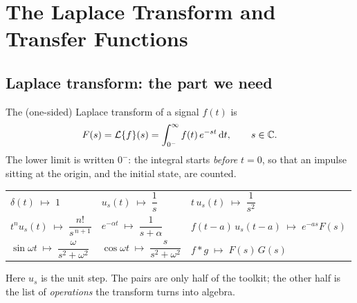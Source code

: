 \documentclass[11pt]{article}
\begin{document}


\section{The Laplace Transform and Transfer Functions}

\subsection{Laplace transform: the part we need}
The (one-sided) Laplace transform of a signal $f(t)$ is
\begin{equation}\label{eq:laplace}
   F(s) = \mathcal{L}\{f\}(s) = \int_{0^{-}}^{\infty} f(t)\,e^{-st}\,\mathrm{d} t ,
   \qquad s\in\mathbb{C}.
\end{equation}
The lower limit is written $0^{-}$: the integral starts \emph{before} $t=0$, so
that an impulse sitting at the origin, and the initial state, are counted.

\smallskip
\begin{center}
\renewcommand{\arraystretch}{2.0}
\begin{tabular}{@{}l@{\qquad\qquad}l@{\qquad\qquad}l@{}}
\toprule
$\delta(t) \;\mapsto\; 1$
  & $u_{s}(t) \;\mapsto\; \dfrac{1}{s}$
  & $t\,u_{s}(t) \;\mapsto\; \dfrac{1}{s^{2}}$\\[6pt]
$t^{n}u_{s}(t) \;\mapsto\; \dfrac{n!}{s^{\,n+1}}$
  & $e^{-\alpha t} \;\mapsto\; \dfrac{1}{s+\alpha}$
  & $f(t-a)\,u_{s}(t-a) \;\mapsto\; e^{-as}F(s)$\\[6pt]
$\sin\omega t \;\mapsto\; \dfrac{\omega}{s^{2}+\omega^{2}}$
  & $\cos\omega t \;\mapsto\; \dfrac{s}{s^{2}+\omega^{2}}$
  & $f*g \;\mapsto\; F(s)\,G(s)$\\
\bottomrule
\end{tabular}
\end{center}

\smallskip\noindent
Here $u_{s}$ is the unit step. The pairs are only half of the toolkit; the other
half is the list of \emph{operations} the transform turns into algebra.
\end{document}
